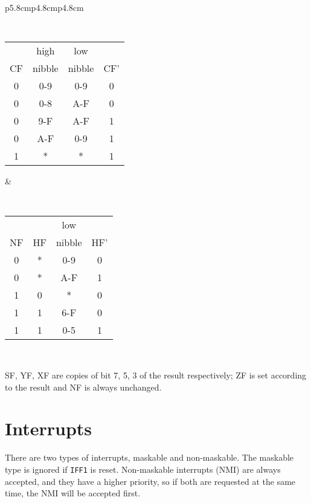 {\begin{tabular}{p{5.8cm}p{4.8cm}p{4.8cm}}
		{\tt
			\begin{tabular}[t]{c|c|c|c}
				   & high   & low    & \\
				CF & nibble & nibble & CF' \\ 	
				\hline
				0 & 0-9    & 0-9    &  0  \\
				0 & 0-8    & A-F    &  0  \\
				0 & 9-F    & A-F    &  1  \\
				0 & A-F    & 0-9    &  1  \\
				1 &  *     &  *     &  1  \\ 
				\hline
			\end{tabular}
		}

		&
		
		{\tt
			\begin{tabular}[t]{c|c|c|c}
				   &    & low    & \\
				NF & HF & nibble & HF' \\ 
				\hline
				0 &  * & 0-9    &  0  \\
				0 &  * & A-F    &  1  \\
				1 &  0 &  *     &  0  \\
				1 &  1 & 6-F    &  0  \\
				1 &  1 & 0-5    &  1  \\ 
				\hline
			\end{tabular}
		}
		
		\\

	\end{tabular}
}

SF, YF, XF are copies of bit 7, 5, 3 of the result respectively; ZF is set according to the result and NF is always unchanged.


\section{Interrupts}
\label{z80_interrupts}

There are two types of interrupts, maskable and non-maskable. The maskable type is ignored if {\tt IFF1} is reset. Non-maskable interrupts (NMI) are always accepted, and they have a higher priority, so if both are requested at the same time, the NMI will be accepted first.

